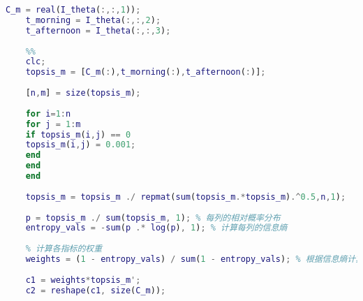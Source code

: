 \documentclass[withoutpreface,bwprint]{cumcmthesis} %
\begin{document}
\begin{appendices}
\begin{lstlisting}[language=matlab]
	C_m = real(I_theta(:,:,1));
	t_morning = I_theta(:,:,2);
	t_afternoon = I_theta(:,:,3);
	
	%%
	clc;
	topsis_m = [C_m(:),t_morning(:),t_afternoon(:)]; 
	
	[n,m] = size(topsis_m);
	
	for i=1:n
	for j = 1:m
	if topsis_m(i,j) == 0
	topsis_m(i,j) = 0.001;
	end
	end
	end
	
	topsis_m = topsis_m ./ repmat(sum(topsis_m.*topsis_m).^0.5,n,1);
	
	p = topsis_m ./ sum(topsis_m, 1); % 每列的相对概率分布
	entropy_vals = -sum(p .* log(p), 1); % 计算每列的信息熵
	
	% 计算各指标的权重
	weights = (1 - entropy_vals) / sum(1 - entropy_vals); % 根据信息熵计算权重
	
	c1 = weights*topsis_m';
	c2 = reshape(c1, size(C_m));
\end{lstlisting}

\end{appendices}
\end{document}
